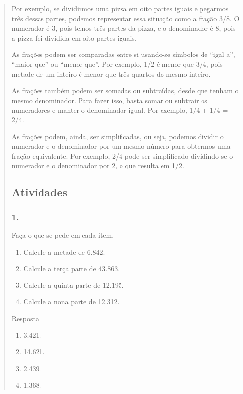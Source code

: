 \begin{enumerate}
\begin{escolha}
\begin{enumerate}
\begin{itemize}
\begin{itemize}
\begin{escolha}
\begin{quote}
\begin{escolha}
{Por exemplo, se dividirmos uma pizza em oito partes iguais e pegarmos três dessas partes, podemos representar essa situação como a fração 3/8. O numerador é 3, pois temos três partes da pizza, e o denominador é 8, pois a pizza foi dividida em oito partes iguais.

As frações podem ser comparadas entre si usando-se símbolos de ``igal a'', ``maior que'' ou ``menor que''. Por exemplo, 1/2 é menor que 3/4, pois metade de um inteiro é menor que três quartos do mesmo inteiro.

As frações também podem ser somadas ou subtraídas, desde que tenham o mesmo denominador. Para fazer isso, basta somar ou subtrair os numeradores e manter o denominador igual. Por exemplo, 1/4 + 1/4 = 2/4.

As frações podem, ainda, ser simplificadas, ou seja, podemos dividir o numerador e o denominador por um mesmo número para obtermos uma fração equivalente. Por exemplo, 2/4 pode ser simplificado dividindo-se o numerador e o denominador por 2, o que resulta em 1/2.

\subsection{Atividades}\label{atividades-8}

\subsubsection{1.}\label{section-104}

Faça o que se pede em cada item.

\begin{enumerate}
\def\labelenumi{\alph{enumi})}
\item
  Calcule a metade de 6.842.
\item
  Calcule a terça parte de 43.863.
\item
  Calcule a quinta parte de 12.195.
\item
  Calcule a nona parte de 12.312.
\end{enumerate}

Resposta:

\begin{enumerate}
\def\labelenumi{\alph{enumi})}
\item
  3.421.
\item
  14.621.
\item
  2.439.
\item
  1.368.
\end{enumerate}

}
\end{escolha}
\end{quote}
\end{escolha}
\end{itemize}
\end{itemize}
\end{enumerate}
\end{escolha}
\end{enumerate}
